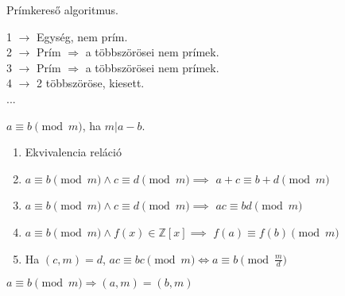 \begin{frame}
  \begin{tcolorbox}[title={Def.: Erathosztenész Szitája}]
    Prímkereső algoritmus.\\
    \mbigskip

    1 $\rightarrow$ Egység, nem prím.\\
    2 $\rightarrow$ Prím $\Rightarrow$ a többszörösei nem prímek.\\
    3 $\rightarrow$ Prím $\Rightarrow$ a többszörösei nem prímek.\\
    4 $\rightarrow$ 2 többszöröse, kiesett.\\
    ...
  \end{tcolorbox}
\end{frame}

\begin{frame}
  \begin{tcolorbox}[title={Def.: Lineáris Kongruencia}]
    $a \equiv b \pmod{m}$, ha $m | a - b$.
  \end{tcolorbox}

  \begin{tcolorbox}[title={Tétel: Kongruencia tulajdonságai}]
    \begin{enumerate}
      \item Ekvivalencia reláció
      \item $a \equiv b \pmod{m} \land c \equiv d \pmod{m} \implies$ \textbf{$a + c \equiv b + d \pmod{m}$}
      \item $a \equiv b \pmod{m} \land c \equiv d \pmod{m} \implies$ \textbf{$ac \equiv bd \pmod{m}$}
      \item $a \equiv b \pmod{m} \land f(x) \in \mathbb{Z}[x] \implies$ \textbf{$f(a) \equiv f(b) \pmod{m}$}
      \item Ha $(c, m) = d$, $ac \equiv bc \pmod{m} \iff a \equiv b \pmod{\frac{m}{d}}$
    \end{enumerate}
  \end{tcolorbox}

  \begin{tcolorbox}[title={Ész}]
    $a \equiv b \pmod{m} \Rightarrow (a, m) = (b, m)$
  \end{tcolorbox}
\end{frame}

